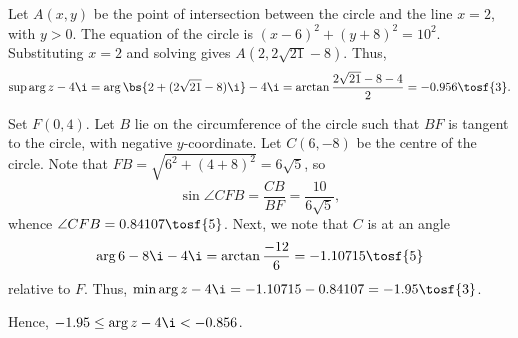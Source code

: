 \begin{solution}
\begin{ppart}
\begin{center}
        \end{center}
    \end{ppart}
    \begin{ppart}
        Let $A(x, y)$ be the point of intersection between the circle and the line $x = 2$, with $y > 0$. The equation of the circle is $(x-6)^2 + (y+8)^2 = 10^2$. Substituting $x = 2$ and solving gives $A(2, 2\sqrt{21} - 8)$. Thus, \[\sup \arg{z - 4\i} = \arg{\bs{2 + (2\sqrt{21} - 8)\i} - 4\i} = \arctan \frac{2\sqrt{21} -8 -4}{2} = -0.956 \tosf{3}.\]

        Set $F(0, 4)$. Let $B$ lie on the circumference of the circle such that $BF$ is tangent to the circle, with negative $y$-coordinate. Let $C(6, -8)$ be the centre of the circle. Note that $FB = \sqrt{6^2 + (4+8)^2} = 6\sqrt{5}$, so \[\sin \angle CFB = \frac{CB}{BF} = \frac{10}{6\sqrt{5}},\] whence $\angle CFB = 0.84107 \tosf{5}$. Next, we note that $C$ is at an angle \[\arg{6-8\i - 4\i} = \arctan \frac{-12}{6} = -1.10715 \tosf{5}\] relative to $F$. Thus, $\min \arg{z-4\i} = -1.10715 - 0.84107 = -1.95 \tosf{3}$.

        Hence, $-1.95 \leq \arg{z-4\i} < -0.856$.
    \end{ppart}
\end{solution}

